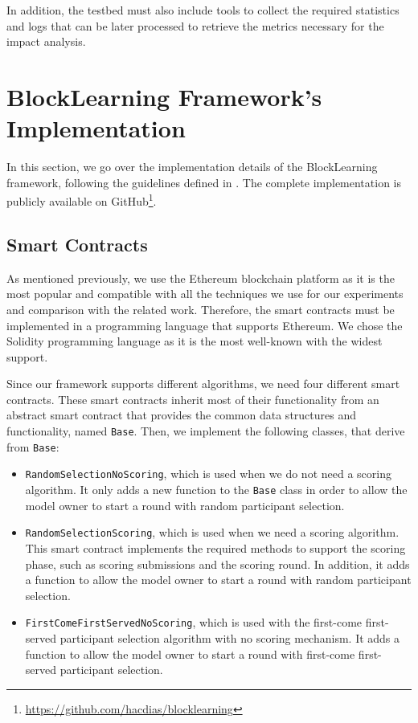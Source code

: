 In addition, the testbed must also include tools to collect the required statistics and logs that can be later processed to retrieve the metrics necessary for the impact analysis.

\section{BlockLearning Framework's Implementation}

In this section, we go over the implementation details of the BlockLearning framework, following the guidelines defined in . The complete implementation is publicly available on GitHub\footnote{\url{https://github.com/hacdias/blocklearning}}.

\subsection{Smart Contracts}

As mentioned previously, we use the Ethereum \cite{wood2014ethereum} blockchain platform as it is the most popular and compatible with all the techniques we use for our experiments and comparison with the related work. Therefore, the smart contracts must be implemented in a programming language that supports Ethereum. We chose the Solidity \cite{solidity} programming language as it is the most well-known with the widest support.

Since our framework supports different algorithms, we need four different smart contracts. These smart contracts inherit most of their functionality from an abstract smart contract that provides the common data structures and functionality, named \texttt{Base}. Then, we implement the following classes, that derive from \texttt{Base}:

\begin{itemize}
    \item \texttt{RandomSelectionNoScoring}, which is used when we do not need a scoring algorithm. It only adds a new function to the \texttt{Base} class in order to allow the model owner to start a round with random participant selection.
    
    \item \texttt{RandomSelectionScoring}, which is used when we need a scoring algorithm. This smart contract implements the required methods to support the scoring phase, such as scoring submissions and the scoring round. In addition, it adds a function to allow the model owner to start a round with random participant selection.
    
    \item \texttt{FirstComeFirstServedNoScoring}, which is used with the first-come first-served participant selection algorithm with no scoring mechanism. It adds a function to allow the model owner to start a round with first-come first-served participant selection.
\end{itemize}

